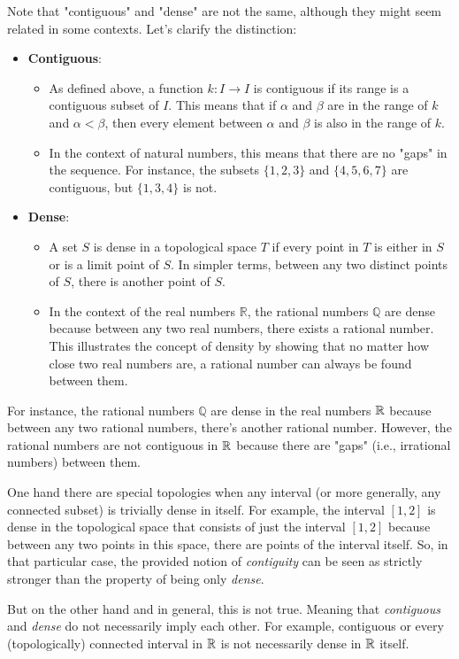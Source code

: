 \begin{observation}
  Note that "contiguous" and "dense" are not the same, although they might seem related in some contexts. Let's clarify the distinction:
  \begin{itemize}
    \item \textbf{Contiguous}:
    \begin{itemize}
      \item As defined above, a function $k:I \to I$ is contiguous if its range is a contiguous subset of $I$. This means that if $\alpha$ and $\beta$ are in the range of $k$ and $\alpha < \beta$, then every element between $\alpha$ and $\beta$ is also in the range of $k$.
      \item In the context of natural numbers, this means that there are no "gaps" in the sequence. For instance, the subsets $\{1,2,3\}$ and $\{4,5,6,7\}$ are contiguous, but $\{1,3,4\}$ is not.
    \end{itemize}
    \item \textbf{Dense}:
    \begin{itemize}
      \item  A set $S$ is dense in a topological space $T$ if every point in $T$ is either in $S$ or is a limit point of $S$. In simpler terms, between any two distinct points of $S$, there is another point of $S$.
      \item In the context of the real numbers $\mathbb{R}$, the rational numbers $\mathbb{Q}$ are dense because between any two real numbers, there exists a rational number. This illustrates the concept of density by showing that no matter how close two real numbers are, a rational number can always be found between them.
    \end{itemize}
  \end{itemize}

  For instance, the rational numbers $\mathbb{Q}$ are dense in the real numbers $\mathbb{R}$ because between any two rational numbers, there's another rational number. However, the rational numbers are not contiguous in $\mathbb{R}$ because there are "gaps" (i.e., irrational numbers) between them. 
  
  One hand there are special topologies when any interval (or more generally, any connected subset) is trivially dense in itself. For example, the interval $[1,2]$ is dense in the topological space that consists of just the interval $[1,2]$ because between any two points in this space, there are points of the interval itself. So, in that particular case, the provided notion of \textit{contiguity} can be seen as strictly stronger than the property of being only \textit{dense}. 
  
  But on the other hand and in general, this is not true. Meaning that \textit{contiguous} and \textit{dense} do not necessarily imply each other. For example, contiguous or every (topologically) connected interval in $\mathbb{R}$ is not necessarily dense in $\mathbb{R}$ itself.
\end{observation}

